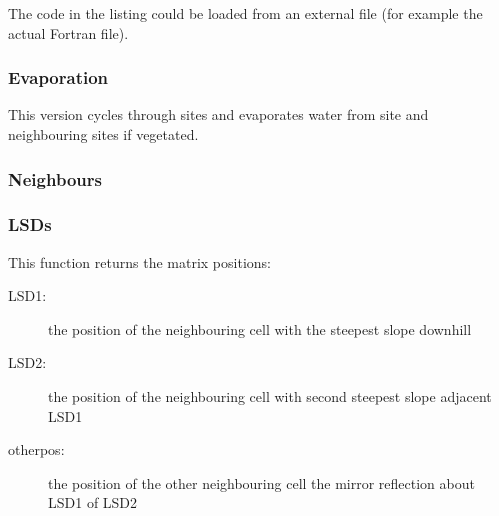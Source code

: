 The code in the listing could be loaded from an external file (for
example the actual Fortran file). 


\subsubsection{Evaporation}


This version cycles through sites and evaporates water from site and
neighbouring sites if vegetated.


\begin{usessubs}
\end{usessubs}

\subsubsection{Neighbours}



\subsubsection{LSDs}


This function returns the matrix positions:

\vspace{-2mm}
\begin{description}
\item [{LSD1:}] the position of the neighbouring cell with the steepest
slope downhill
\item [{LSD2:}] the position of the neighbouring cell with second steepest
slope adjacent LSD1
\item [{otherpos:}] the position of the other neighbouring cell the mirror
reflection about LSD1 of LSD2
\end{description}

